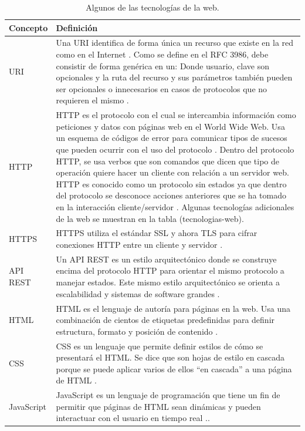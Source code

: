 \begin{table}[h!]
    \begin{tabular}{|p{}|p{}|}
    	\hline
        Concepto & Definición \\
    	\hline
        URI & Una URI identifica de forma única un recurso que existe en la red como en el Internet \citep{Webopedia-URI}. Como se define en el RFC 3986, debe consistir de forma genérica en un:
        \newline
[protocolo de acceso][usuario][clave][dominio][ruta de recurso][parámetros de acceso al recurso]
		\newline
Donde usuario, clave son opcionales y la ruta del recurso y sus parámetros también pueden ser opcionales o innecesarios en casos de protocolos que no requieren el mismo \citep{RFC3986}. \\
        \hline
    	HTTP & HTTP es el protocolo con el cual se intercambia información como peticiones y datos con páginas web en el World Wide Web. Usa un esquema de códigos de error para comunicar tipos de sucesos que pueden ocurrir con el uso del protocolo \citep{ComputerHope-HTTP}. Dentro del protocolo HTTP, se usa verbos que son comandos que dicen que tipo de operación quiere hacer un cliente con relación a un servidor web. HTTP es conocido como un protocolo sin estados ya que dentro del protocolo se desconoce acciones anteriores que se ha tomado en la interacción cliente/servidor \citep{Webopedia-HTTP}. Algunas tecnologías adicionales de la web se muestran en la tabla (tecnologias-web). \\
        \hline
        HTTPS & HTTPS utiliza el estándar SSL y ahora TLS para cifrar conexiones HTTP entre un cliente y servidor \citep{ComputerHope-HTTP}. \\
        \hline
        API REST & Un API REST es un estilo arquitectónico donde se construye encima del protocolo HTTP para orientar el mismo protocolo a manejar estados. Este mismo estilo arquitectónico se orienta a escalabilidad y sistemas de software grandes \citep{Webopedia-REST}. \\
        \hline
        HTML & HTML es el lenguaje de autoría para páginas en la web. Usa una combinación de cientos de etiquetas predefinidas para definir estructura, formato y posición de contenido \citep{Webopedia-HTML}. \\
        \hline
        CSS & CSS es un lenguaje que permite definir estilos de cómo se presentará el HTML. Se dice que son hojas de estilo en cascada porque se puede aplicar varios de ellos “en cascada” a una página de HTML \citep{Webopedia-CSS}. \\
        \hline
        JavaScript & JavaScript es un lenguaje de programación que tiene un fin de permitir que páginas de HTML sean dinámicas y pueden interactuar con el usuario en tiempo real \citep{Webopedia-JavaScript}.. \\
        \hline
    \end{tabular}
	\caption{Algunos de las tecnologías de la web.}
    \label{tecnologias-web}
\end{table}

